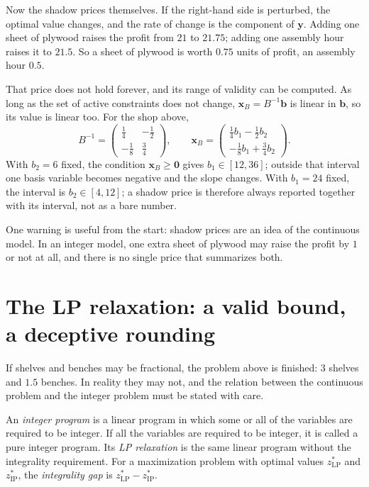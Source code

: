 Now the shadow prices themselves. If the right-hand side is perturbed, the optimal value
changes, and the rate of change is the component of $\mathbf{y}$. Adding one sheet of plywood
raises the profit from $21$ to $21.75$; adding one assembly hour raises it to
$21.5$. So a sheet of plywood is worth $0.75$ units of profit, an assembly hour
$0.5$.

That price does not hold forever, and its range of validity can be computed. As long as the set
of active constraints does not change, $\mathbf{x}_{B}=B^{-1}\mathbf{b}$ is linear in
$\mathbf{b}$, so its value is linear too. For the shop above,
\[
  B^{-1}=\begin{pmatrix}\tfrac14&-\tfrac12\\[2pt]-\tfrac18&\tfrac34\end{pmatrix},
  \qquad
  \mathbf{x}_{B}=\begin{pmatrix}\tfrac14b_{1}-\tfrac12b_{2}\\[2pt]
  -\tfrac18b_{1}+\tfrac34b_{2}\end{pmatrix}.
\]
With $b_{2}=6$ fixed, the condition $\mathbf{x}_{B}\ge\mathbf{0}$ gives $b_{1}\in[12,36]$;
outside that interval one basis variable becomes negative and the slope changes. With $b_{1}=24$
fixed, the interval is $b_{2}\in[4,12]$; a shadow price is therefore always
reported together with its interval, not as a bare number.

One warning is useful from the start: shadow prices are an idea of the continuous model. In an
integer model, one extra sheet of plywood may raise the profit by $1$ or not at all, and there is
no single price that summarizes both.

\section{The LP relaxation: a valid bound, a deceptive rounding}

If shelves and benches may be fractional, the problem above is finished: $3$ shelves and
$1.5$ benches. In reality they may not, and the relation between the continuous problem and
the integer problem must be stated with care.

\begin{definisi}
An \emph{integer program} is a linear program in which some or all of the variables are
required to be integer. If all the variables are required to be integer, it is called a pure
integer program. Its \emph{LP relaxation} is the same linear program without the integrality
requirement. For a maximization problem with optimal values $z^{*}_{\mathrm{LP}}$ and
$z^{*}_{\mathrm{IP}}$, the \emph{integrality gap} is $z^{*}_{\mathrm{LP}}-z^{*}_{\mathrm{IP}}$.
\end{definisi}


